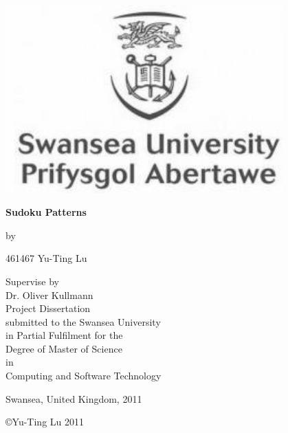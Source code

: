 \documentclass[11pt]{report}
\begin{document}
\begin{center}
\begin{titlepage}

\includegraphics[width=0.8\textwidth]{./logo}\\ \vspace{15pt}

\Huge \textbf{Sudoku Patterns}\\ \bigskip

\large by\\ \bigskip

461467 Yu-Ting Lu\\ \vspace{20pt}

Supervise by\\\vspace{6pt}
Dr. Oliver Kullmann\\ \vspace{20pt}
Project Dissertation\\ \vspace{6pt}
submitted to the Swansea University\\ \vspace{6pt}
in Partial Fulfilment for the\\ \vspace{6pt}
\Large Degree of Master of Science\\ \vspace{6pt}
\large in\\ \vspace{12pt}
Computing and Software Technology\\ \vspace{60pt}



Swansea, United Kingdom, 2011\\ \vspace{12pt}

\small \copyright Yu-Ting Lu 2011
\end{titlepage}

\end{center}
\end{document}
